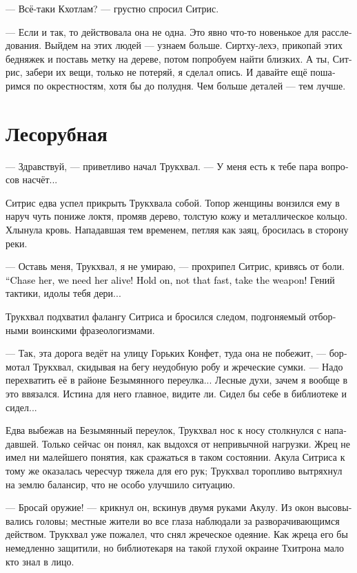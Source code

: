 \documentclass[a4paper,12pt,fleqn]{book}\usepackage{cooltooltips}\usepackage{polyglossia}\setdefaultlanguage[babelshorthands=true]{russian}\setotherlanguage{english}\defaultfontfeatures{Ligatures=TeX,Mapping=tex-text} \usepackage{xcolor}\definecolor{lightgray}{HTML}{bbbbbb}\color{lightgray}\newcommand{\ml}[3]{\textenglish{\textcolor{black}{#3}} }
\begin{document}
--- Всё-таки Кхотлам? --- грустно спросил Ситрис.

--- Если и так, то действовала она не одна.
Это явно что-то новенькое для расследования.
Выйдем на этих людей --- узнаем больше.
Сиртху-лехэ, прикопай этих бедняжек и поставь метку на дереве, потом попробуем найти близких.
А ты, Ситрис, забери их вещи, только не потеряй, я сделал опись.
И давайте ещё пошаримся по окрестностям, хотя бы до полудня.
Чем больше деталей --- тем лучше.

\section{Лесорубная}

--- Здравствуй, --- приветливо начал Трукхвал.
--- У меня есть к тебе пара вопросов насчёт...

Ситрис едва успел прикрыть Трукхвала собой.
Топор женщины вонзился ему в наруч чуть пониже локтя, промяв дерево, толстую кожу и металлическое кольцо.
Хлынула кровь.
Нападавшая тем временем, петляя как заяц, бросилась в сторону реки.

--- Оставь меня, Трукхвал, я не умираю, --- прохрипел Ситрис, кривясь от боли.
\ml{$0$}
{--- Беги, она нужна нам живой!}
{``Chase her, we need her alive!}
\ml{$0$}
{Да подожди, куда побежал, оружие возьми!}
{Hold on, not that fast, take the weapon!}
Гений тактики, идолы тебя дери...

Трукхвал подхватил фалангу Ситриса и бросился следом, подгоняемый отборными воинскими фразеологизмами.

--- Так, эта дорога ведёт на улицу Горьких Конфет, туда она не побежит, --- бормотал Трукхвал, скидывая на бегу неудобную робу и жреческие сумки.
--- Надо перехватить её в районе Безымянного переулка...
Лесные духи, зачем я вообще в это ввязался.
Истина для него главное, видите ли.
Сидел бы себе в библиотеке и сидел...

Едва выбежав на Безымянный переулок, Трукхвал нос к носу столкнулся с нападавшей.
Только сейчас он понял, как выдохся от непривычной нагрузки.
Жрец не имел ни малейшего понятия, как сражаться в таком состоянии.
Акула Ситриса к тому же оказалась чересчур тяжела для его рук;
Трукхвал торопливо вытряхнул на землю балансир, что не особо улучшило ситуацию.

--- Бросай оружие! --- крикнул он, вскинув двумя руками Акулу.
Из окон высовывались головы;
местные жители во все глаза наблюдали за разворачивающимся действом.
Трукхвал уже пожалел, что снял жреческое одеяние.
Как жреца его бы немедленно защитили, но библиотекаря на такой глухой окраине Тхитрона мало кто знал в лицо.
\end{document}

